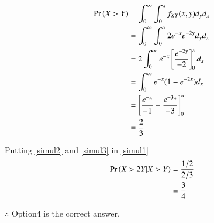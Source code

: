 \documentclass[journal,12pt,twocolumn]{IEEEtran}
\begin{document}
\begin{align}
    \Pr\left(X>Y\right) &= \int_{0}^{\infty}\int_{0}^{x} f_{XY}(x,y) d_yd_x \\
             &= \int_{0}^{\infty}\int_{0}^{x}2e^{-x}e^{-2y}d_yd_x \\
             &= 2\int_{0}^{\infty}e^{-x}\left[\frac{e^{-2y}}{-2}\right]_0^{x}d_x\\
             &= \int_{0}^{\infty}e^{-x}(1-e^{-2x})d_x\\
             &= \left[\frac{e^{-x}}{-1} - \frac{e^{-3x}}{-3}\right]_0^\infty\\
             &= \frac{2}{3} \label{simul3}
\end{align}

Putting \eqref{simul2} and \eqref{simul3} in \eqref{simul1}
\begin{align}
    \Pr\left(X>2Y|X>Y\right) &= \frac{1/2}{2/3}\\
                  &= \frac{3}{4}
\end{align}

$\therefore$ Option4 is the correct answer.
\end{document}
